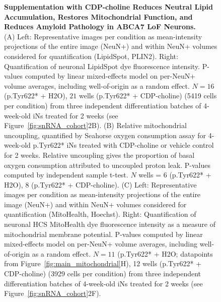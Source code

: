\begin{figure}[ht]




    \caption{
        \textbf{Supplementation with CDP-choline Reduces Neutral Lipid Accumulation, Restores Mitochondrial Function, and Reduces Amyloid Pathology in ABCA7 LoF Neurons.}\\[1ex]
        (A) Left: Representative images per condition as mean-intensity projections of the entire image (NeuN+) and within NeuN+ volumes considered for quantification (LipidSpot, PLIN2). Right: Quantification of neuronal LipidSpot dye fluorescence intensity. P-values computed by linear mixed-effects model on per-NeuN+ volume averages, including well-of-origin as a random effect. $N = 16$ (p.Tyr622* + H2O), $21$ wells (p.Tyr622* + CDP-choline) (5419 cells per condition) from three independent differentiation batches of 4-week-old iNs treated for 2 weeks (see Figure~\ref{fig:snRNA_cohort}2B). 
        (B) Relative mitochondrial uncoupling, quantified by Seahorse oxygen consumption assay for 4-week-old p.Tyr622* iNs treated with CDP-choline or vehicle control for 2 weeks. Relative uncoupling gives the proportion of basal oxygen consumption attributed to uncoupled proton leak. P-values computed by independent sample t-test. $N$ wells = 6 (p.Tyr622* + H2O), 8 (p.Tyr622* + CDP-choline). 
        (C) Left: Representative images per condition as mean-intensity projections of the entire image (NeuN+) and within NeuN+ volumes considered for quantification (MitoHealth, Hoechst). Right: Quantification of neuronal HCS MitoHealth dye fluorescence intensity as a measure of mitochondrial membrane potential. P-values computed by linear mixed-effects model on per-NeuN+ volume averages, including well-of-origin as a random effect. $N = 11$ (p.Tyr622* + H2O; datapoints from Figure~\ref{fig:main_mitochondrial}H), 12 wells (p.Tyr622* + CDP-choline) (3929 cells per condition) from three independent differentiation batches of 4-week-old iNs treated for 2 weeks (see Figure~\ref{fig:snRNA_cohort}2F). 
}
\end{figure}
